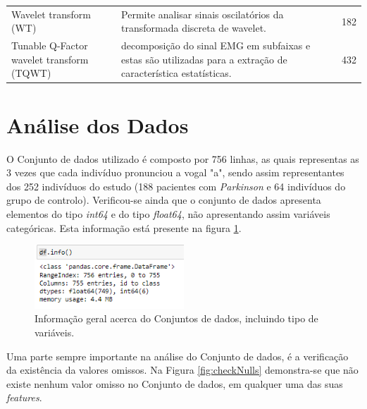 \documentclass[12pt,a4paper,twoside]{report}
\begin{document}
{\begin{table}[H]
{\begin{tabular}{lll}
Wavelet transform (WT)                     & Permite analisar sinais oscilatórios da transformada discreta de wavelet.                                                                                                                                                                                                          & 182                         \\
Tunable Q-Factor wavelet transform (TQWT)  & decomposição do sinal EMG em subfaixas e estas são utilizadas para a extração de característica estatísticas.                                                                                                                                                                      & 432                         \\ \hline
\end{tabular}%
}
\end{table}

\section{Análise dos Dados}

O Conjunto de dados utilizado é composto por 756 linhas, as quais representas as 3 vezes que cada indivíduo pronunciou a vogal "a", sendo assim representantes dos 252 indivíduos do estudo (188 pacientes com \textit{Parkinson} e 64 indivíduos do grupo de controlo). Verificou-se ainda que o conjunto de dados apresenta elementos do tipo \textit{int64} e do tipo \textit{float64}, não apresentando assim variáveis categóricas. Esta informação está presente na figura \ref{fig:datasetInfo}.

\begin{figure}[H]
    \centering
    \includegraphics[width=0.5\textwidth]{imagens/datasetInfo.png}
    \caption{Informação geral acerca do Conjuntos de dados, incluindo tipo de variáveis.}
    \label{fig:datasetInfo}
\end{figure}

Uma parte sempre importante na análise do Conjunto de dados, é a verificação da existência da valores omissos. Na Figura \ref{fig:checkNulls} demonstra-se que não existe nenhum valor omisso no Conjunto de dados, em qualquer uma das suas \textit{features}. 

}
\end{document}
